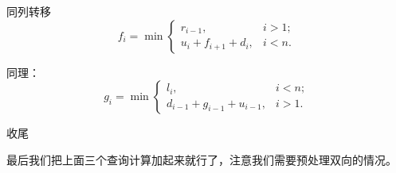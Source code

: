 \documentclass{beamer}
\begin{document}
{\begin{frame}{同列转移}
\[
  f_i = \min \begin{cases}
    r_{i - 1}, &i > 1;\\
    u_i + f_{i + 1} + d_i, &i < n.
  \end{cases}
\]

同理：
\[
  g_i = \min \begin{cases}
    l_i, & i < n;\\
    d_{i - 1} + g_{i  - 1} + u_{i - 1}, &i > 1.
  \end{cases}
\]


\end{frame}

\begin{frame}{收尾}

最后我们把上面三个查询计算加起来就行了，注意我们需要预处理双向的情况。

\end{frame}


}
\end{document}
